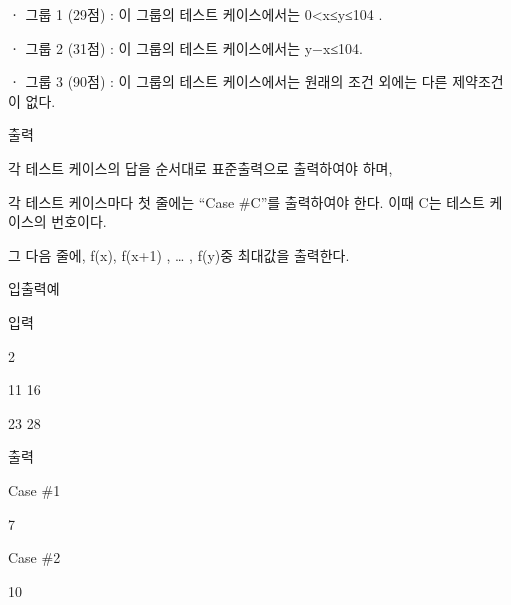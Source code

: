 \documentclass [12pt] {oblivoir}
\begin{document}
ㆍ 그룹 1 (29점) : 이 그룹의 테스트 케이스에서는 0<x≤y≤104 .

ㆍ 그룹 2 (31점) : 이 그룹의 테스트 케이스에서는 y−x≤104.

ㆍ 그룹 3 (90점) : 이 그룹의 테스트 케이스에서는 원래의 조건 외에는 다른 제약조건이 없다.

출력

각 테스트 케이스의 답을 순서대로 표준출력으로 출력하여야 하며,

각 테스트 케이스마다 첫 줄에는 “Case \#C”를 출력하여야 한다. 이때 C는 테스트 케이스의 번호이다.

그 다음 줄에, f(x), f(x+1) , … , f(y)중 최대값을 출력한다.

입출력예

입력

2

11 16

23 28

출력

Case \#1

7

Case \#2

10
\end{document}
